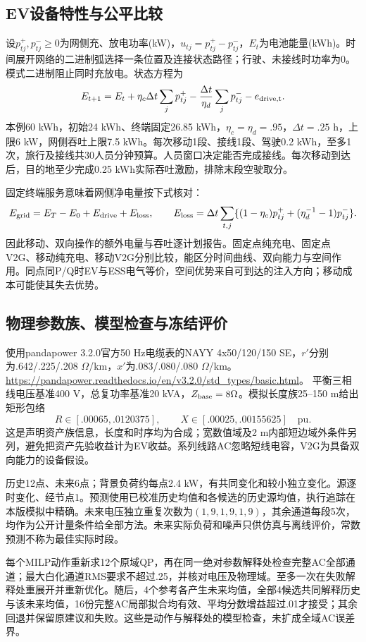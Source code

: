 \documentclass[UTF8,fontset=fandol,11pt,a4paper]{ctexart}
\begin{document}
\subsection{EV设备特性与公平比较}
设$p^+_{tj},p^-_{tj}\ge0$为网侧充、放电功率(kW)，$u_{tj}=p^+_{tj}-p^-_{tj}$，$E_t$为电池能量(kWh)。时间展开网络的二进制弧选择一条位置及连接状态路径；行驶、未接线时功率为0。模式二进制阻止同时充放电。状态方程为
\[
E_{t+1}=E_t+\eta_c\Delta t\sum_jp^+_{tj}
-\frac{\Delta t}{\eta_d}\sum_jp^-_{tj}-e_{\rm drive,t}.
\]
本例60 kWh，初始24 kWh、终端固定26.85 kWh，$\eta_c=\eta_d=.95$，$\Delta t=.25$ h，上限6 kW，网侧吞吐上限7.5 kWh。每次移动1段、接线1段、驾驶0.2 kWh，至多1次，旅行及接线共30人员分钟预算。人员窗口决定能否完成接线。每次移动到达后，目的地至少完成0.25 kWh实际吞吐激励，排除末段空驶取分。

固定终端服务意味着网侧净电量按下式核对：
\[
E_{\rm grid}=E_T-E_0+E_{\rm drive}+E_{\rm loss},\qquad
E_{\rm loss}=\Delta t\sum_{t,j}
\{(1-\eta_c)p^+_{tj}+(\eta_d^{-1}-1)p^-_{tj}\}.
\]
因此移动、双向操作的额外电量与吞吐逐计划报告。固定点纯充电、固定点V2G、移动纯充电、移动V2G分别比较，能区分时间曲线、双向能力与空间作用。同点同P/Q时EV与ESS电气等价，空间优势来自可到达的注入方向；移动成本可能使其失去优势。

\subsection{物理参数族、模型检查与冻结评价}
使用pandapower 3.2.0官方50 Hz电缆表的NAYY 4x50/120/150 SE，$r'$分别为.642/.225/.208 $\Omega$/km，$x'$为.083/.080/.080 $\Omega$/km。
\url{https://pandapower.readthedocs.io/en/v3.2.0/std_types/basic.html}。
平衡三相线电压基准400 V，总复功率基准20 kVA，$Z_{\rm base}=8\Omega$。模拟长度族25--150 m给出矩形包络
\[
R\in[.00065,.0120375],\qquad X\in[.00025,.00155625]\quad\mathrm{pu}.
\]
这是声明资产族信息，长度和时序均为合成；宽数值域及2 m内部短边域外条件另列，避免把资产先验收益计为EV收益。系列线路AC忽略短线电容，V2G为具备双向能力的设备假设。

历史12点、未来6点；背景负荷约每点2.4 kW，有共同变化和较小独立变化。源逐时变化、经节点1。预测使用已校准历史均值和各候选的历史源均值，执行追踪在本版模拟中精确。未来电压独立重复次数为$(1,9,1,9,1,9)$，其余通道每段5次，均作为公开计量条件给全部方法。未来实际负荷和噪声只供仿真与离线评价，常数预测不称为最佳实际时段。

每个MILP动作重新求12个原域QP，再在同一绝对参数解释处检查完整AC全部通道；最大白化通道RMS要求不超过.25，并核对电压及物理域。至多一次在失败解释处重展开并重新优化。随后，4个参考各产生未来均值，全部4候选共同解释历史与该未来均值，16份完整AC局部拟合均有效、平均分数增益超过.01才接受；其余回退并保留原建议和失败。这些是动作与解释处的模型检查，未扩成全域AC误差界。
\end{document}
